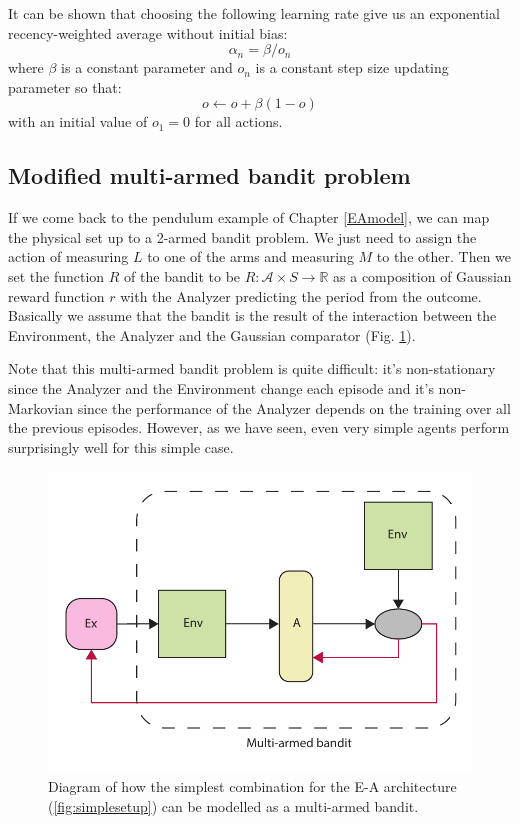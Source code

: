 \documentclass[11pt,a4paper,twoside]{report}
\newcommand{\+}{\textnormal{+} }
\theoremstyle{definition}
\numberwithin{equation}{chapter}
\begin{document}
  It can be shown that choosing the following learning rate give us an
  exponential recency-weighted average without initial bias:
  \begin{equation}
    \alpha_n = \beta/o_n
  \end{equation}
  where $\beta$ is a constant parameter and $o_n$ is a constant step size
  updating parameter so that:
  \begin{equation}
    o \gets o + \beta(1-o) 
  \end{equation}
  with an initial value of $o_1=0$ for all actions.

\subsection{Modified multi-armed bandit problem}

If we come back to the pendulum example of Chapter \ref{EAmodel}, we can map the
physical set up to a 2-armed bandit problem. We just need to assign the action
of  measuring $L$ to one of the arms and measuring $M$ to the other. Then we set
the function $R$ of the bandit to be $R:\mathcal{A}\times S\rightarrow
\mathbb{R}$ as a composition of Gaussian reward function $r$ with the Analyzer
predicting the period from the outcome. Basically we assume that the bandit is
the result of the interaction between the Environment, the Analyzer and the
Gaussian comparator (Fig. \ref{fig:Bandit-EA}). \par Note that this multi-armed
bandit problem is quite difficult: it's non-stationary since the Analyzer and
the Environment change each episode and it's non-Markovian since the performance
of the Analyzer depends on the training over all the previous episodes.
However, as we have seen, even very simple agents perform surprisingly well for
this simple case.


\begin{figure}
  \centering 
\includegraphics[scale=0.75]{figures/Bandit-EA.pdf}
\caption{Diagram of how the simplest combination for the E-A architecture
(\ref{fig:simplesetup}) can be modelled as a multi-armed bandit.}
\label{fig:Bandit-EA}
\end{figure}
\end{document}

